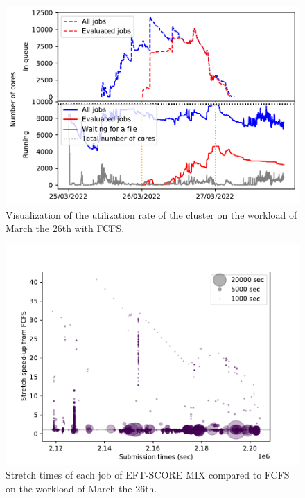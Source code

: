 \documentclass[conference,10pt]{IEEEtran}
\begin{document}
\begin{figure}[H]\centering\includegraphics[scale=0.47]{../MBSS/plot/Cluster_usage/2022-03-26->2022-03-26_V10000_Fcfs_Used_nodes_Reduced_450_128_32_256_4_1024_core_by_core.pdf}\caption{Visualization of the utilization rate of the cluster on the workload of March the 26th with FCFS.}\end{figure}
\begin{figure}[H]\centering\includegraphics[scale=0.47]{../MBSS/plot/Stretch_times/Stretch_times_FCFS_EFT-SCORE-MIX_2022-03-26->2022-03-26_V10000_450_128_32_256_4_1024.pdf}\caption{Stretch times of each job of EFT-SCORE MIX compared to FCFS on the workload of March the 26th.}\end{figure}

\end{document}
